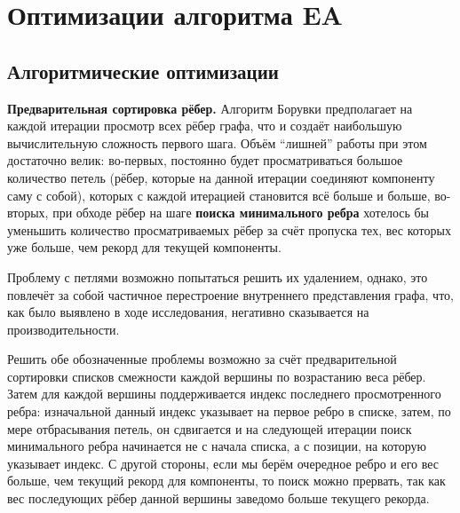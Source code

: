 \documentclass[a4paper,10pt]{extarticle}
\begin{document}


\section{Оптимизации алгоритма EA}
\label{sec:eaopt}

\subsection{Алгоритмические оптимизации}
\label{subsec:optAlgo}

\textbf{Предварительная сортировка рёбер.}
Алгоритм Борувки предполагает на каждой итерации просмотр всех рёбер графа, что и создаёт наибольшую вычислительную сложность первого шага.
Объём ``лишней'' работы при этом достаточно велик: 
во-первых, постоянно будет просматриваться большое количество петель (рёбер, которые на данной итерации соединяют компоненту саму с собой), которых с каждой итерацией становится всё больше и больше, 
во-вторых, при обходе рёбер на шаге \textbf{поиска минимального ребра} хотелось бы уменьшить количество просматриваемых рёбер за счёт пропуска тех, вес которых уже больше, чем рекорд для текущей компоненты.

Проблему с петлями возможно попытаться решить их удалением, однако, это повлечёт за собой частичное перестроение внутреннего представления графа, что, как было выявлено в ходе исследования, негативно сказывается на производительности.

Решить обе обозначенные проблемы возможно за счёт предварительной сортировки списков смежности каждой вершины по возрастанию веса рёбер. Затем для каждой вершины поддерживается индекс последнего просмотренного ребра: изначальной данный индекс указывает на первое ребро в списке, затем, по мере отбрасывания петель, он сдвигается и на следующей итерации поиск минимального ребра начинается не с начала списка, а с позиции, на которую указывает индекс. С другой стороны, если мы берём очередное ребро и его вес больше, чем текущий рекорд для компоненты, то поиск можно прервать, так как вес последующих рёбер данной вершины заведомо больше текущего рекорда.
\end{document}
